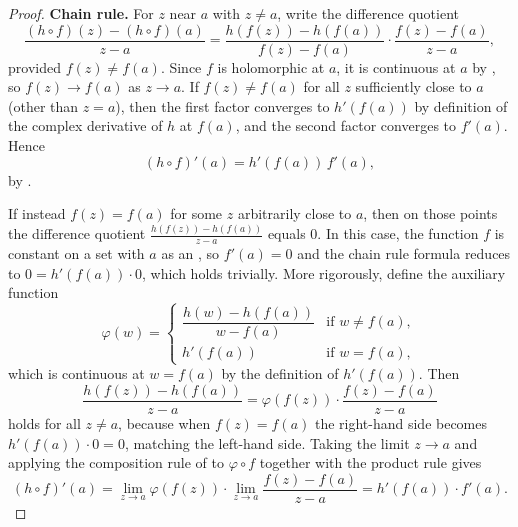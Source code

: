 \begin{proof}
    \textbf{Chain rule.} For $z$ near $a$ with $z \neq a$, write the difference quotient
    $$\frac{(h \circ f)(z) - (h \circ f)(a)}{z - a} = \frac{h(f(z)) - h(f(a))}{f(z) - f(a)} \cdot \frac{f(z) - f(a)}{z - a},$$
    provided $f(z) \neq f(a)$.  Since $f$ is holomorphic at $a$, it is continuous at $a$ by , so $f(z) \to f(a)$ as $z \to a$.  If $f(z) \neq f(a)$ for all $z$ sufficiently close to $a$ (other than $z = a$), then the first factor converges to $h'(f(a))$ by definition of the complex derivative of $h$ at $f(a)$, and the second factor converges to $f'(a)$.  Hence
    $$(h \circ f)'(a) = h'(f(a))\,f'(a),$$
    by .

    If instead $f(z) = f(a)$ for some $z$ arbitrarily close to $a$, then on those points the difference quotient $\frac{h(f(z)) - h(f(a))}{z - a}$ equals $0$.  In this case, the function $f$ is constant on a set with $a$ as an , so $f'(a) = 0$ and the chain rule formula reduces to $0 = h'(f(a))\cdot 0$, which holds trivially.  More rigorously, define the auxiliary function
    $$\varphi(w) = \begin{cases}
        \dfrac{h(w) - h(f(a))}{w - f(a)} & \text{if } w \neq f(a), \\[1em]
        h'(f(a)) & \text{if } w = f(a),
    \end{cases}$$
    which is continuous at $w = f(a)$ by the definition of $h'(f(a))$.  Then
    $$\frac{h(f(z)) - h(f(a))}{z - a} = \varphi(f(z)) \cdot \frac{f(z) - f(a)}{z - a}$$
    holds for all $z \neq a$, because when $f(z) = f(a)$ the right-hand side becomes $h'(f(a)) \cdot 0 = 0$, matching the left-hand side.  Taking the limit $z \to a$ and applying the composition rule of  to $\varphi \circ f$ together with the product rule gives
    $$(h \circ f)'(a) = \lim_{z \to a} \varphi(f(z)) \cdot \lim_{z \to a} \frac{f(z) - f(a)}{z - a} = h'(f(a)) \cdot f'(a).$$
\end{proof}